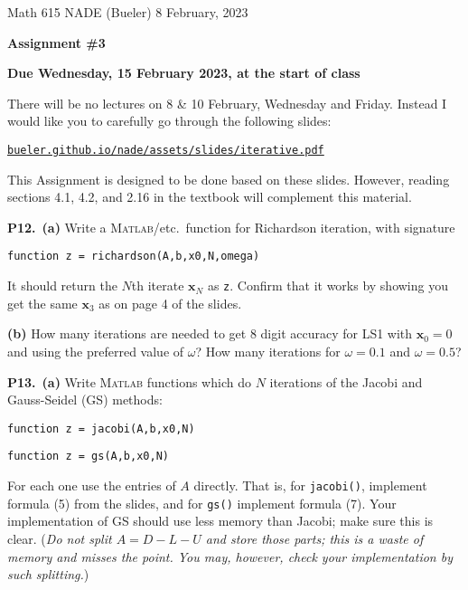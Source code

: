 \documentclass[12pt]{amsart}
\newcommand{\bx}{\mathbf{x}}
\newcommand{\prob}[1]{\bigskip\noindent\textbf{#1.}\quad }
\newcommand{\epart}[1]{\medskip\noindent\textbf{(#1)}\quad }
\newcommand{\ppart}[1]{\,\textbf{(#1)}\quad }
\newcommand{\Matlab}{\textsc{Matlab}\xspace}
\begin{document}
\scriptsize \noindent Math 615 NADE (Bueler) \hfill 8 February, 2023
\normalsize

\medskip\bigskip

\Large\centerline{\textbf{Assignment \#3}}
\large
\bigskip

\centerline{\textbf{Due Wednesday, 15 February 2023, at the start of class}}
\bigskip
\normalsize

\thispagestyle{empty}

\bigskip
There will be no lectures on 8 \& 10 February, Wednesday and Friday.  Instead I would like you to carefully go through the following slides:

\medskip
\centerline{\href{http://bueler.github.io/nade/assets/slides/iterative.pdf}{\texttt{bueler.github.io/nade/assets/slides/iterative.pdf}}}

\medskip
\noindent  This Assignment is designed to be done based on these slides.  However, reading sections 4.1, 4.2, and 2.16 in the textbook will complement this material.

\medskip

\prob{P12}  \ppart{a} Write a \Matlab/etc.~function for Richardson iteration, with signature

\bigskip
\centerline{\texttt{function z = richardson(A,b,x0,N,omega)}}

\bigskip
\noindent It should return the $N$th iterate $\bx_N$ as \texttt{z}.  Confirm that it works by showing you get the same $\bx_3$ as on page 4 of the slides.

\epart{b}  How many iterations are needed to get 8 digit accuracy for LS1 with $\bx_0=0$ and using the preferred value of $\omega$?  How many iterations for $\omega = 0.1$ and $\omega = 0.5$?


\prob{P13}  \ppart{a}  Write \Matlab functions which do $N$ iterations of the Jacobi and Gauss-Seidel (GS) methods:

\medskip
\centerline{\texttt{function z = jacobi(A,b,x0,N)}}

\centerline{\texttt{function z = gs(A,b,x0,N)}}

\medskip
\noindent For each one use the entries of $A$ directly.  That is, for \texttt{jacobi()}, implement formula (5) from the slides, and for \texttt{gs()} implement formula (7).  Your implementation of GS should use less memory than Jacobi; make sure this is clear.  (\emph{Do not split $A=D-L-U$ and store those parts; this is a waste of memory and misses the point.  You may, however, check your implementation by such splitting.}) 
\end{document}
